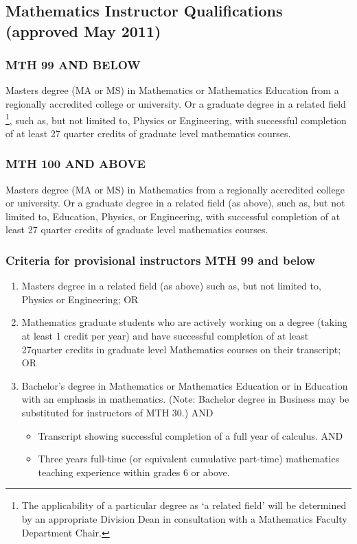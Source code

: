 \subsection{Mathematics Instructor Qualifications (approved May 2011)}
\subsubsection{MTH 99 AND BELOW}
Masters degree (MA or MS) in Mathematics or Mathematics Education from a regionally accredited college or university.  Or a graduate degree in a related field \footnote{The applicability of a particular degree as `a related field' will be determined by an appropriate Division Dean in consultation with a Mathematics Faculty Department Chair.
    }, such as, but not limited to, Physics or Engineering, with successful completion of at least 27 quarter credits of graduate level mathematics courses.
\subsubsection{MTH 100 AND ABOVE}
Masters degree (MA or MS) in Mathematics from a regionally accredited college or university.  Or a graduate degree in a related field (as above), such as, but not limited to, Education, Physics, or Engineering, with successful completion of at least 27 quarter credits of graduate level mathematics courses.
\subsubsection{Criteria for provisional instructors MTH 99 and below }
\begin{enumerate}
  \item Masters degree in a related field (as above) such as, but not limited to, Physics or Engineering; OR
  \item Mathematics graduate students who are actively working on a degree (taking at least 1 credit per year) and have successful completion of at least 27quarter credits in graduate level Mathematics courses on their transcript; OR
  \item Bachelor's degree in Mathematics or Mathematics Education or in Education with an emphasis in mathematics.  (Note: Bachelor degree in Business may be substituted for instructors of MTH 30.)
    AND 
    \begin{itemize}
      \item Transcript showing successful completion of a full year of calculus.
        AND
      \item Three years full-time (or equivalent cumulative part-time) mathematics teaching experience within grades 6 or above.
    \end{itemize}
\end{enumerate}
